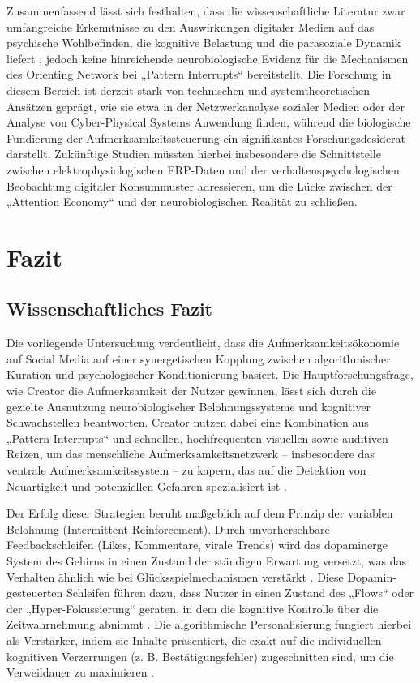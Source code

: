 \documentclass[11pt,a4paper]{article}
\begin{document}
Zusammenfassend lässt sich festhalten, dass die wissenschaftliche Literatur zwar umfangreiche Erkenntnisse zu den Auswirkungen digitaler Medien auf das psychische Wohlbefinden, die kognitive Belastung und die parasoziale Dynamik liefert \autocite{grey_grey_5d5c282590c448fc8776b04f78a08de5,grey_grey_d4bc9c0d0e8441ba90398520e73af07d,grey_grey_b52a063f344f4bb6bb0b07a772233fbf}, jedoch keine hinreichende neurobiologische Evidenz für die Mechanismen des Orienting Network bei „Pattern Interrupts“ bereitstellt. Die Forschung in diesem Bereich ist derzeit stark von technischen und systemtheoretischen Ansätzen geprägt, wie sie etwa in der Netzwerkanalyse sozialer Medien \autocite{arxiv_2008_08370} oder der Analyse von Cyber-Physical Systems \autocite{arxiv_1409_0385} Anwendung finden, während die biologische Fundierung der Aufmerksamkeitssteuerung ein signifikantes Forschungsdesiderat darstellt. Zukünftige Studien müssten hierbei insbesondere die Schnittstelle zwischen elektrophysiologischen ERP-Daten und der verhaltenspsychologischen Beobachtung digitaler Konsummuster adressieren, um die Lücke zwischen der „Attention Economy“ und der neurobiologischen Realität zu schließen.

\section{Fazit}

\subsection{Wissenschaftliches Fazit}

Die vorliegende Untersuchung verdeutlicht, dass die Aufmerksamkeitsökonomie auf Social Media auf einer synergetischen Kopplung zwischen algorithmischer Kuration und psychologischer Konditionierung basiert. Die Hauptforschungsfrage, wie Creator die Aufmerksamkeit der Nutzer gewinnen, lässt sich durch die gezielte Ausnutzung neurobiologischer Belohnungssysteme und kognitiver Schwachstellen beantworten. Creator nutzen dabei eine Kombination aus „Pattern Interrupts“ und schnellen, hochfrequenten visuellen sowie auditiven Reizen, um das menschliche Aufmerksamkeitsnetzwerk – insbesondere das ventrale Aufmerksamkeitssystem – zu kapern, das auf die Detektion von Neuartigkeit und potenziellen Gefahren spezialisiert ist .

Der Erfolg dieser Strategien beruht maßgeblich auf dem Prinzip der variablen Belohnung (Intermittent Reinforcement). Durch unvorhersehbare Feedbackschleifen (Likes, Kommentare, virale Trends) wird das dopaminerge System des Gehirns in einen Zustand der ständigen Erwartung versetzt, was das Verhalten ähnlich wie bei Glücksspielmechanismen verstärkt . Diese Dopamin-gesteuerten Schleifen führen dazu, dass Nutzer in einen Zustand des „Flows“ oder der „Hyper-Fokussierung“ geraten, in dem die kognitive Kontrolle über die Zeitwahrnehmung abnimmt . Die algorithmische Personalisierung fungiert hierbei als Verstärker, indem sie Inhalte präsentiert, die exakt auf die individuellen kognitiven Verzerrungen (z. B. Bestätigungsfehler) zugeschnitten sind, um die Verweildauer zu maximieren .
\end{document}

